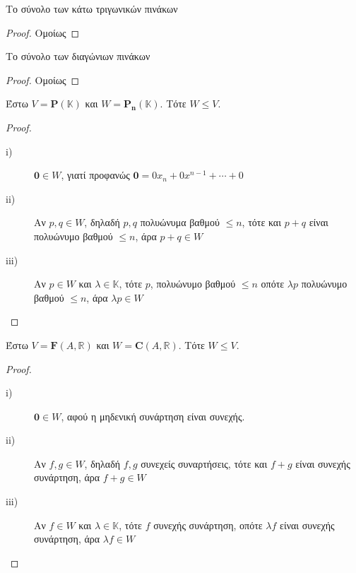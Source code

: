 \begin{examples}
\begin{enumerate}
        \item \textcolor{Col2}{Το σύνολο των κάτω τριγωνικών πινάκων}
            \begin{proof}
                Ομοίως
            \end{proof}

        \item \textcolor{Col2}{Το σύνολο των διαγώνιων πινάκων}

            \begin{proof}
                Ομοίως
            \end{proof}

        \item Έστω $ V = \mathbf{P}(\mathbb{K}) $ και 
            $ W = \mathbf{P_{n}}(\mathbb{K})$.  Τότε $ W \leq V $.  
            \begin{proof}
            \item {}
                \begin{description}
                    \item [i)]  $ \mathbf{0} \in W $, γιατί προφανώς 
                        $ \mathbf{0} = 0 x_{n} + 0 x^{n-1} + \cdots + 0 $
                    \item [ii)]
                        Αν $ p, q \in W $, δηλαδή $ p,q $ πολυώνυμα βαθμού $ \leq n $, 
                        τότε και $ p+q $ είναι πολυώνυμο βαθμού $ \leq n $, άρα 
                        $p+q \in W$
                    \item[iii)] Αν $ p \in W $ και $ \lambda \in \mathbb{K} $, τότε 
                        $p$, πολυώνυμο βαθμού $ \leq n $ οπότε $ \lambda p$ πολυώνυμο 
                        βαθμού $ \leq n $, άρα $ \lambda p \in W $
                \end{description}
            \end{proof}

        \item Έστω $ V = \mathbf{F}(A, \mathbb{R}) $ και $ W = 
            \mathbf{C}(A, \mathbb{R}) $.  Τότε $ W \leq V $.  
            \begin{proof}
            \item {}
                \begin{description}
                    \item [i)] $ \mathbf{0} \in W $, αφού η μηδενική συνάρτηση 
                        είναι συνεχής.
                    \item [ii)]
                        Αν $ f, g \in W $, δηλαδή $ f,g $ συνεχείς συναρτήσεις, 
                        τότε και $ f+g $ είναι συνεχής συνάρτηση, άρα $f+g \in W$
                    \item[iii)] Αν $ f \in W $ και $ \lambda \in \mathbb{K} $, τότε 
                        $f$ συνεχής συνάρτηση, οπότε $ \lambda f$ είναι 
                        συνεχής συνάρτηση, άρα $ \lambda f \in W $
                \end{description}
            \end{proof}


\end{enumerate}
\end{examples}
